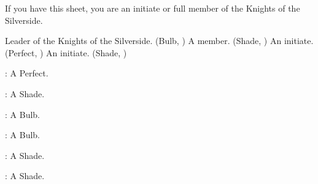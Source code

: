 \documentclass[blue]{Silversiders}
\begin{document}
\name{\bKnights{}}

If you have this sheet, you are an initiate or full member of the Knights of the Silverside.

\begin{members}
	\member{\cHonor{}} Leader of the Knights of the Silverside. (Bulb, \cHonor{\Sex})
	\member{\cTraitor{}} A member. (Shade, \cTraitor{\Sex})
	\member{\cTruth{}} An initiate. (Perfect, \cTruth{\Sex})
	\member{\cWisdom{}} An initiate. (Shade, \cWisdom{\Sex})
	
\end{members}

\begin{itemz}
	\item \cMuscle{}: A \cMuscle{\sex} Perfect.
	\item \cIngenuity{}: A \cIngenuity{\sex} Shade.
	\item \cOutcast{}: A \cOutcast{\sex} Bulb.
	\item \cCaregiver{}: A \cCaregiver{\sex} Bulb.
	\item \cLove{}: A \cLove{\sex} Shade.
	\item \cTrickster{}: A \cTrickster{\sex} Shade.

\end{itemz}
\end{document}
